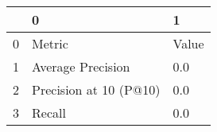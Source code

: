 \begin{tabular}{lll}
\toprule
{} &                       0 &      1 \\
\midrule
0 &                  Metric &  Value \\
1 &       Average Precision &    0.0 \\
2 &  Precision at 10 (P@10) &    0.0 \\
3 &                  Recall &    0.0 \\
\bottomrule
\end{tabular}
